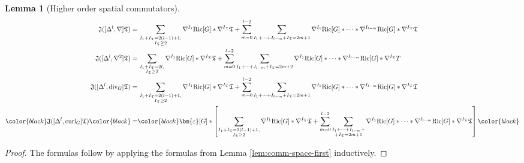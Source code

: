 \documentclass[11pt,leqno,textwidth=10cm]{amsart}
\numberwithin{equation}{section}
\theoremstyle{definition}
\theoremstyle{plain}
\newtheorem{lemma}[definition]{Lemma}
\newcommand{\1}{\mathbbm{1}}
\newcommand{\I}{\mathbb{I}}
\newcommand{\Ric}{\text{\normalfont{Ric}}}
\renewcommand{\epsilon}{\varepsilon}
\newcommand{\Lap}{\Delta}
\renewcommand{\div}{\text{\normalfont{div}}}
\newcommand{\curl}{\text{\normalfont{curl}}}
\newcommand{\epsilonLC}{\bm{\epsilon}}
\newcommand{\change}[1]{\color{black}#1\color{black}}
\begin{document}
\begin{lemma}[Higher order spatial commutators]
\begin{subequations}
{\begin{align*}
\mathfrak{J}([\Lap^l,\nabla]\mathfrak{T})=&\,\sum_{\substack{I_1+I_\mathfrak{T}=2(l-1)+1,\\I_\mathfrak{T}\geq2}}\nabla^{I_1}\Ric[G]\ast\nabla^{I_\mathfrak{T}}\mathfrak{T}+\sum_{m=0}^{l-2}\sum_{I_1+\dots+I_{l-m}+I_\mathfrak{T}=2m+1}\nabla^{I_1}\Ric[G]\ast\dots\ast\nabla^{I_{l-m}}\Ric[G]\ast\nabla^{I_\mathfrak{T}}\mathfrak{T}\\
\mathfrak{J}([\Lap^l,\nabla^2]\mathfrak{T})=&\,\sum_{\substack{I_1+I_\mathfrak{T}=2l,\\I_\mathfrak{T}\geq2}}\nabla^{I_1}\Ric[G]\ast\nabla^{I_\mathfrak{T}}\mathfrak{T}+\sum_{m=0}^{l-2}\sum_{I_1+\dots+I_{l-m}+I_\mathfrak{T}=2m+2}\nabla^{I_1}\Ric[G]\ast\dots\ast\nabla^{I_{l-m}}\Ric[G]\ast\nabla^{I_\mathfrak{T}}T\\
\mathfrak{J}([\Lap^l,\div_G]\mathfrak{T})=&\,\sum_{\substack{I_1+I_\mathfrak{T}=2(l-1)+1,\\I_\mathfrak{T}\geq2}}\nabla^{I_1}\Ric[G]\ast\nabla^{I_\mathfrak{T}}\mathfrak{T}+\sum_{m=0}^{l-2}\sum_{I_1+\dots+I_{l-m}+I_\mathfrak{T}=2m+1}\nabla^{I_1}\Ric[G]\ast\dots\ast\nabla^{I_{l-m}}\Ric[G]\ast\nabla^{I_\mathfrak{T}}\mathfrak{T}\\
\change{\mathfrak{J}([\Lap^l,\curl_G]\mathfrak{T})}=&\change{\epsilonLC[G]\ast\left[\sum_{\substack{I_1+I_\mathfrak{T}=2(l-1)+1,\\I_\mathfrak{T}\geq2}}\nabla^{I_1}\Ric[G]\ast\nabla^{I_\mathfrak{T}}\mathfrak{T}+\sum_{m=0}^{l-2}\sum_{\substack{I_1+\dots+I_{l-m}+\\+I_\mathfrak{T}=2m+1}}\nabla^{I_1}\Ric[G]\ast\dots\ast\nabla^{I_{l-m}}\Ric[G]\ast\nabla^{I_\mathfrak{T}}\mathfrak{T}\right]}
\end{align*}}
\end{subequations}
\end{lemma}
\begin{proof}
The formulas follow by applying the formulas from Lemma \ref{lem:comm-space-first} inductively.
\end{proof}
\end{document}
